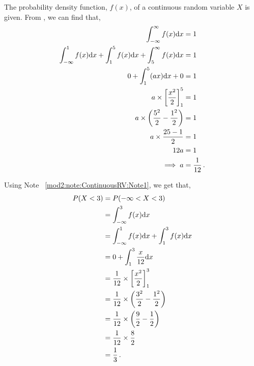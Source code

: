 %
%


\begin{subquestions}
	
\subquestion

The probability density function, $f(x)$, of a continuous random variable $X$ is given.
From , we can find that,
\begin{align}
	\int_{-\infty}^{\infty} f(x)\mathrm{d}x  & = 1 \nonumber \\
	\int_{-\infty}^{1} f(x)\mathrm{d}x+\int_{1}^{5} f(x)\mathrm{d}x+\int_{5}^{\infty} f(x)\mathrm{d}x & = 1 \nonumber \\
	0 + \int_{1}^{5} (ax)\mathrm{d}x + 0 & = 1 \nonumber \\
	a \times \left[\frac{x^2}{2}\right]^5_1 & = 1 \nonumber \\
	a \times \left(\frac{5^2}{2}- \frac{1^2}{2}\right) & = 1 \nonumber \\
	a \times \frac{25-1}{2} & = 1 \nonumber \\
	12a & = 1 \nonumber \\
	\implies a & = \frac{1}{12} \,.
\end{align}
	

\subquestion

Using Note ~\ref{mod2:note:ContinuousRV:Note1}, we get that,
\begin{align}
	P(X<3) & = P(-\infty<X<3) \nonumber \\
	       & = \int_{-\infty}^{3} f(x)\mathrm{d}x \nonumber \\
	       & = \int_{-\infty}^{1} f(x)\mathrm{d}x + \int_{1}^{3} f(x)\mathrm{d}x \nonumber \\
	       & = 0 + \int_{1}^{3}\frac{x}{12} \mathrm{d}x \nonumber \\
	       & = \frac{1}{12} \times \left[\frac{x^2}{2}\right]^3_1 \nonumber \\
	       & = \frac{1}{12} \times \left(\frac{3^2}{2} - \frac{1^2}{2}\right) \nonumber \\
	       & = \frac{1}{12} \times \left(\frac{9}{2} - \frac{1}{2}\right) \nonumber \\
	       & = \frac{1}{12} \times \frac{8}{2} \nonumber \\
	       & = \frac{1}{3} \,. 
\end{align}
	

\end{subquestions}
